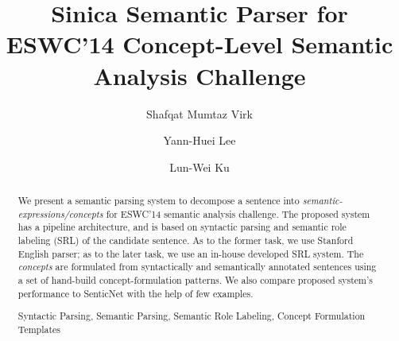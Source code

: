 \documentclass[runningheads,a4paper]{llncs}
\newcommand{\keywords}[1]{\par\addvspace\baselineskip
\noindent\keywordname\enspace\ignorespaces#1}
\begin{document}
\mainmatter  %

\title{Sinica Semantic Parser for ESWC'14 Concept-Level Semantic Analysis Challenge }


%
%
\author{Shafqat Mumtaz Virk%
\and Yann-Huei Lee\and Lun-Wei Ku}
%


%
%

\maketitle



\begin{abstract}
We present a semantic parsing system to decompose a sentence into \textit{semantic-expressions/concepts} for ESWC'14 semantic analysis challenge. The proposed system has a pipeline architecture, and is based on syntactic parsing and semantic role labeling (SRL) of the candidate sentence. As to the former task, we use Stanford English parser; as to the later task, we use an in-house developed SRL system. The \textit{concepts} are formulated from syntactically and semantically annotated sentences using a set of hand-build concept-formulation patterns. We also compare proposed system's performance to SenticNet with the help of few examples.
\keywords{Syntactic Parsing, Semantic Parsing, Semantic Role Labeling, Concept Formulation Templates}                 
\end{abstract}
\end{document}
